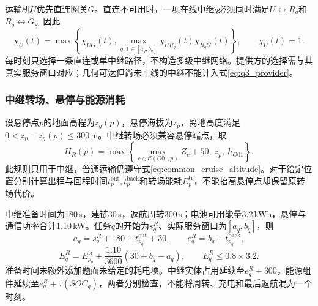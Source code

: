 运输机$U$优先直连网关$G$。直连不可用时，一项在线中继$q$必须同时满足$U\leftrightarrow R_q$和$R_q\leftrightarrow G$。因此
\begin{equation}
 \chi_U(t)=\max\left\{\chi_{UG}(t),\max_{q:\,t\in[a_q,b_q]}
 \chi_{UR_q}(t)\chi_{R_qG}(t)\right\},\qquad \chi_U(t)=1.
\label{eq:q3_provider}
\end{equation}
每时刻只选择一条直连或单中继路径，不构造多级中继网络。提供方的选择需与其真实服务窗口对应；几何可达但尚未上线的中继不能计入式\eqref{eq:q3_provider}。



\subsubsection{中继转场、悬停与能源消耗}
设悬停点$p$的地面高程为$z_g(p)$，悬停海拔为$z_p$，离地高度满足$0<z_p-z_g(p)\le300$\,m。中继转场必须兼容悬停端点，取
\begin{equation}
 H_R(p)=\max\left\{\max_{c\in\mathcal C(O01,p)}Z_c+50,\ z_p,\ h_{O01}\right\}.
\label{eq:q3_relay_height}
\end{equation}
此规则只用于中继，普通运输仍遵守式\eqref{eq:common_cruise_altitude}。对于给定位置分别计算出程与回程时间$t_p^{\mathrm{out}},t_p^{\mathrm{back}}$和转场能耗$E_p^{\mathrm{tr}}$，不能抬高悬停点却保留原转场代价。

中继准备时间为180\,s，建链30\,s，返航周转300\,s；电池可用能量3.2\,kWh，悬停与通信功率合计1.10\,kW。任务$q$的开始为$s_q^R$、实际服务窗口为$[a_q,b_q]$，则
\begin{equation}
 a_q=s_q^R+180+t_{p_q}^{\mathrm{out}}+30,
 \qquad e_q^R=b_q+t_{p_q}^{\mathrm{back}},
\label{eq:q3_lifecycle}
\end{equation}
\begin{equation}
 E_q^R=E_{p_q}^{\mathrm{tr}}+\frac{1.10}{3600}(30+b_q-a_q),
 \qquad E_q^R\le0.8\times3.2.
\label{eq:q3_relay_energy}
\end{equation}
准备时间未额外添加题面未给定的耗电项。中继实体占用延续至$e_q^R+300$，能源组件延续至$e_q^R+\tau(SOC_q)$，两者分别检查，不能将周转、充电和最后返航混为一个时刻。

